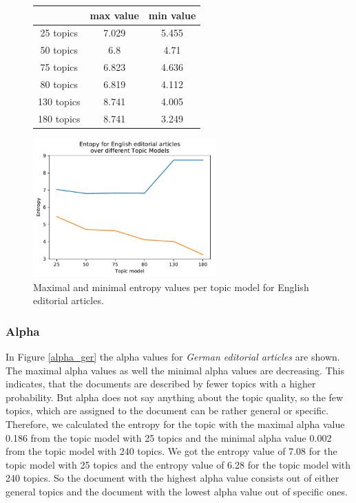 \begin{figure}[h]
	\begin{minipage}{0.5\textwidth}
		\centering
		\begin{tabular}[t]{c|cc}
			&max value & min value\\
			\hline
			25 topics&7.029&5.455\\
			50 topics&6.8&4.71\\
			75 topics&6.823&4.636\\
			80 topics&	6.819&4.112\\
			130 topics & 8.741&4.005\\
			180 topics&	8.741&3.249\\
		\end{tabular}
	\end{minipage}%
	\begin{minipage}{0.5\textwidth}
		\centering
		\includegraphics[width=7cm]{gfx/Eval_IC/English_Editorial_Entropy.pdf}
	\end{minipage}
	\caption{Maximal and minimal entropy values per topic model for English editorial articles.}
	\label{entr_english}
\end{figure}

\subsubsection{Alpha}

In Figure \ref{alpha_ger} the alpha values for \textit{German editorial articles} are shown. The maximal alpha values as well the minimal alpha values are decreasing. This indicates, that the documents are described by fewer topics with a higher probability. But alpha does not say anything about the topic quality, so the few topics, which are assigned to the document can be rather general or specific. Therefore, we calculated the entropy for the topic with the maximal alpha value 0.186 from the topic model with 25 topics and the minimal alpha value 0.002 from the topic model with 240 topics. We got the entropy value of 7.08 for the topic model with 25 topics and the entropy value of 6.28 for the topic model with 240 topics. So the document with the highest alpha value consists out of either general topics and the document with the lowest alpha value out of specific ones. 

